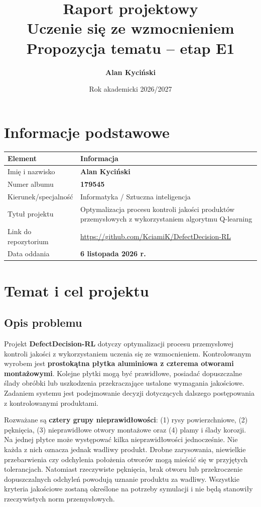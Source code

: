 \documentclass[12pt]{article}
\title{Raport projektowy\\Uczenie się ze wzmocnieniem\\[0.35em]\large Propozycja tematu -- etap E1}
\author{\textbf{Alan Kyciński}}
\date{Rok akademicki 2026/2027}
\begin{document}
\maketitle
\tableofcontents
\newpage


\section{Informacje podstawowe}

\begin{center}
\renewcommand{\arraystretch}{1.22}
\begin{tabular}{p{}p{}}
\toprule
Element & Informacja \\
\midrule
Imię i nazwisko & \textbf{Alan Kyciński} \\
Numer albumu & \textbf{179545} \\
Kierunek/specjalność & Informatyka / Sztuczna inteligencja \\
Tytuł projektu & Optymalizacja procesu kontroli jakości produktów przemysłowych z wykorzystaniem algorytmu Q-learning \\
Link do repozytorium & {\small\url{https://github.com/KciamiK/DefectDecision-RL}} \\
Data oddania & \textbf{6 listopada 2026 r.} \\
\bottomrule
\end{tabular}
\end{center}

\section{Temat i cel projektu}

\subsection{Opis problemu}

Projekt \textbf{DefectDecision-RL} dotyczy optymalizacji procesu przemysłowej kontroli jakości z wykorzystaniem uczenia się ze wzmocnieniem. Kontrolowanym wyrobem jest \textbf{prostokątna płytka aluminiowa z czterema otworami montażowymi}. Kolejne płytki mogą być prawidłowe, posiadać dopuszczalne ślady obróbki lub uszkodzenia przekraczające ustalone wymagania jakościowe. Zadaniem systemu jest podejmowanie decyzji dotyczących dalszego postępowania z kontrolowanymi produktami.

Rozważane są \textbf{cztery grupy nieprawidłowości}: (1) rysy powierzchniowe, (2) pęknięcia, (3) nieprawidłowe otwory montażowe oraz (4) plamy i ślady korozji. Na jednej płytce może występować kilka nieprawidłowości jednocześnie. Nie każda z nich oznacza jednak wadliwy produkt. Drobne zarysowania, niewielkie przebarwienia czy odchylenia położenia otworów mogą mieścić się w przyjętych tolerancjach. Natomiast rzeczywiste pęknięcia, brak otworu lub przekroczenie dopuszczalnych odchyleń powodują uznanie produktu za wadliwy. Wszystkie kryteria jakościowe zostaną określone na potrzeby symulacji i nie będą stanowiły rzeczywistych norm przemysłowych.
\end{document}

